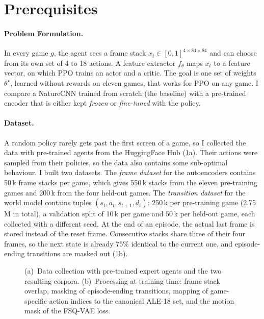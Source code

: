 \documentclass[runningheads]{llncs}
\begin{document}
\section{Prerequisites}
\label{sec:prereq}

\paragraph{Problem Formulation.} In every game $g$, the agent sees a frame stack
$x_t\in[0,1]^{4\times84\times84}$ and can choose from its own set of 4 to 18 actions. A feature
extractor $f_\theta$ maps $x_t$ to a feature vector, on which PPO trains an actor and a critic.
The goal is one set of weights $\theta^\star$, learned without rewards on eleven games, that
works for PPO on any game. I compare a NatureCNN trained from scratch (the baseline) with a
pre-trained encoder that is either kept \emph{frozen} or \emph{fine-tuned} with the policy.

\paragraph{Dataset.} A random policy rarely gets past the first screen of a game, so I
collected the data with pre-trained agents from the HuggingFace Hub (\cref{fig:data}a). Their actions were sampled from their policies, so the data also contains some sub-optimal
behaviour. I built two datasets. The \emph{frame dataset} for the
autoencoders contains 50\,k frame stacks per game, which gives 550\,k stacks from the eleven
pre-training games and 200\,k from the four held-out games. The \emph{transition dataset} for
the world model contains tuples $(s_t,a_t,s_{t+1},d_t)$: 250\,k per pre-training game (2.75\,M in
total), a validation split of 10\,k per game and 50\,k per held-out game, each collected with a
different seed. At the end of an episode, the actual last frame is stored instead of the reset frame.
Consecutive stacks share three of their four frames, so the next state is already 75\%
identical to the current one, and episode-ending transitions are masked out (\cref{fig:data}b).

\begin{figure}[!htbp]
\centering

\caption{(a)~Data collection with pre-trained expert agents and the two resulting corpora.
(b)~Processing at training time: frame-stack overlap, masking of episode-ending
transitions, mapping of game-specific action indices to the canonical ALE-18 set, and the
motion mask of the FSQ-VAE loss.}
\label{fig:data}
\end{figure}
\end{document}
